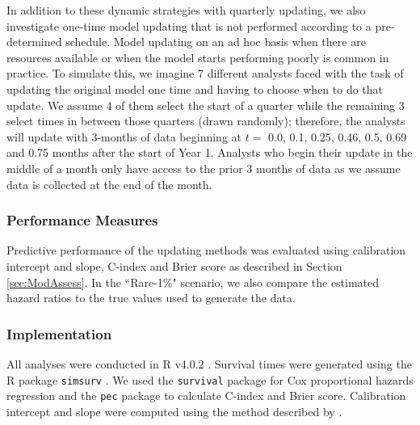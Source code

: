 \documentclass[]{article}
\begin{document}
In addition to these dynamic strategies with quarterly updating, we also investigate one-time model updating that is not performed according to a pre-determined schedule. Model updating on an ad hoc basis when there are resources available or when the model starts performing poorly is common in practice.  To simulate this, we imagine 7 different analysts faced with the task of updating the original model one time and having to choose when to do that update. We assume 4 of them select the start of a quarter while the remaining 3 select times in between those quarters (drawn randomly); therefore, the analysts will update with 3-months of data beginning at $t=$ 0.0, 0.1, 0.25, 0.46, 0.5, 0.69 and 0.75 months after the start of Year 1. Analysts who begin their update in the middle of a month only have access to the prior 3 months of data as we assume data is collected at the end of the month.






\subsubsection{Performance Measures}
Predictive performance of the updating methods was evaluated using calibration intercept and slope, C-index and Brier score as described in Section \ref{sec:ModAssess}. In the ``Rare-1\%" scenario, we also compare the estimated hazard ratios to the true values used to generate the data. 

  


\subsubsection{Implementation}

All analyses were conducted in R v4.0.2 \citep{RCoreTeam2017}. Survival times were generated using the R package \texttt{simsurv} \citep{Brilleman2021}. We used the \texttt{survival} package \citep{Therneau2000} for Cox proportional hazards regression and the \texttt{pec} package \citep{Mogensen2012} to calculate C-index and Brier score. Calibration intercept and slope were computed using the method described by \citet{Crowson2016}.
\end{document}
